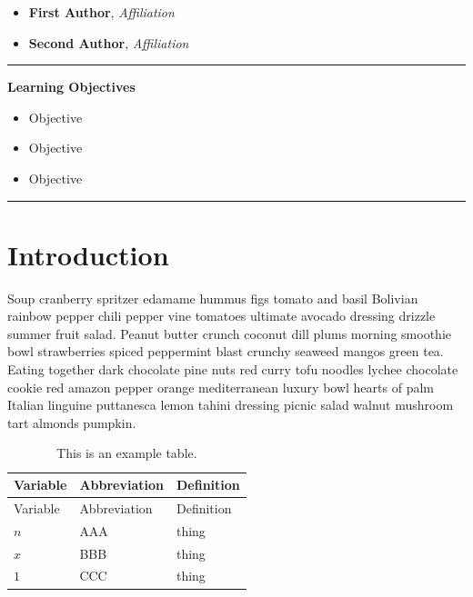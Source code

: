 \documentclass{book}
\providecommand{\tightlist}{%
  \setlength{\itemsep}{0pt}\setlength{\parskip}{0pt}}
\begin{document}
\begin{itemize}
\tightlist
\item
  \textbf{First Author}, \emph{Affiliation}
\item
  \textbf{Second Author}, \emph{Affiliation}
\end{itemize}

\begin{center}\rule{0.5\linewidth}{0.5pt}\end{center}

\textbf{Learning Objectives}

\begin{itemize}
\tightlist
\item
  Objective
\item
  Objective
\item
  Objective
\end{itemize}

\begin{center}\rule{0.5\linewidth}{0.5pt}\end{center}

\hypertarget{introduction}{%
\section{Introduction}\label{introduction}}

Soup cranberry spritzer edamame hummus figs tomato and basil Bolivian rainbow
pepper chili pepper vine tomatoes ultimate avocado dressing drizzle summer
fruit salad. Peanut butter crunch coconut dill plums morning smoothie bowl
strawberries spiced peppermint blast crunchy seaweed mangos green tea. Eating
together dark chocolate pine nuts red curry tofu noodles lychee chocolate
cookie red amazon pepper orange mediterranean luxury bowl hearts of palm
Italian linguine puttanesca lemon tahini dressing picnic salad walnut mushroom
tart almonds pumpkin.

\hypertarget{tbl:variables}{}
\begin{longtable}[]{@{}lll@{}}
\caption{\label{tbl:variables}This is an example table.}\tabularnewline
\toprule
Variable & Abbreviation & Definition \\
\midrule
\endfirsthead
\toprule
Variable & Abbreviation & Definition \\
\midrule
\endhead
\(n\) & AAA & thing \\
\(x\) & BBB & thing \\
\(1\) & CCC & thing \\
\bottomrule
\end{longtable}
\end{document}
